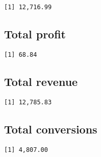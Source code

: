 \documentclass[
]{article}
\begin{document}
\begin{verbatim}
[1] 12,716.99
\end{verbatim}

\hypertarget{total-profit}{%
\subsection{Total profit}\label{total-profit}}

\begin{verbatim}
[1] 68.84
\end{verbatim}

\hypertarget{total-revenue}{%
\subsection{Total revenue}\label{total-revenue}}

\begin{verbatim}
[1] 12,785.83
\end{verbatim}

\hypertarget{total-conversions}{%
\subsection{Total conversions}\label{total-conversions}}

\begin{verbatim}
[1] 4,807.00
\end{verbatim}
\end{document}
